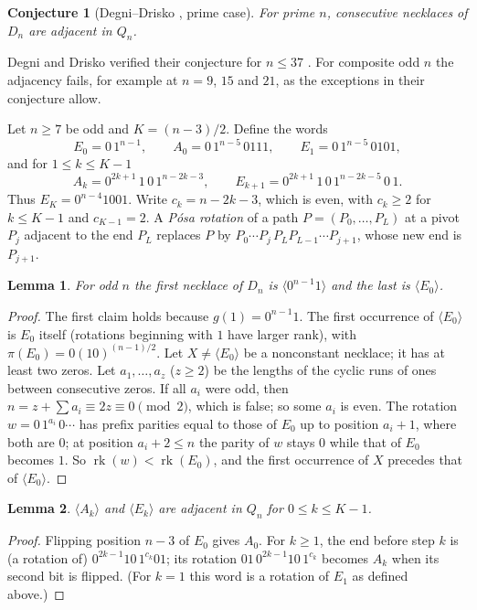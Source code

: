 \documentclass[11pt]{article}
\newtheorem{lemma}{Lemma}
\newtheorem{conjecture}{Conjecture}
\newcommand{\rk}{\operatorname{rk}}
\begin{document}
\begin{conjecture}[Degni--Drisko \cite{DD07}, prime case]\label{conj:DD}
For prime $n$, consecutive necklaces of $D_n$ are adjacent in $Q_n$.
\end{conjecture}

Degni and Drisko verified their conjecture for $n\le 37$ \cite[Section 3]{DD07}. For composite odd $n$ the adjacency
fails, for example at $n=9$, $15$ and $21$, as the exceptions in their conjecture allow.

Let $n\ge7$ be odd and $K=(n-3)/2$. Define the words
\[
E_0=0\,1^{n-1},\qquad A_0=0\,1^{n-5}\,0111,\qquad E_1=0\,1^{n-5}\,0101,
\]
and for $1\le k\le K-1$
\[
A_k=0^{2k+1}\,1\,0\,1^{n-2k-3},\qquad E_{k+1}=0^{2k+1}\,1\,0\,1^{n-2k-5}\,0\,1 .
\]
Thus $E_K=0^{n-4}1001$. Write $c_k=n-2k-3$, which is even, with $c_k\ge 2$ for $k\le K-1$ and $c_{K-1}=2$. A
\emph{P\'osa rotation} of a path $P=(P_0,\dots,P_L)$ at a pivot $P_j$ adjacent to the end $P_L$ replaces $P$ by
$P_0\cdots P_j\,P_L P_{L-1}\cdots P_{j+1}$, whose new end is $P_{j+1}$.

\begin{lemma}\label{lem:last}
For odd $n$ the first necklace of $D_n$ is $\langle0^{n-1}1\rangle$ and the last is $\langle E_0\rangle$.
\end{lemma}
\begin{proof}
The first claim holds because $g(1)=0^{n-1}1$. The first occurrence of $\langle E_0\rangle$ is $E_0$ itself
(rotations beginning with $1$ have larger rank), with $\pi(E_0)=0(10)^{(n-1)/2}$. Let $X\ne\langle E_0\rangle$ be a
nonconstant necklace; it has at least two zeros. Let $a_1,\dots,a_z$ ($z\ge2$) be the lengths of the cyclic runs of
ones between consecutive zeros. If all $a_i$ were odd, then $n=z+\sum a_i\equiv 2z\equiv0\pmod2$, which is false; so
some $a_i$ is even. The rotation $w=0\,1^{a_i}\,0\cdots$ has prefix parities equal to those of $E_0$ up to position
$a_i+1$, where both are $0$; at position $a_i+2\le n$ the parity of $w$ stays $0$ while that of $E_0$ becomes $1$.
So $\rk(w)<\rk(E_0)$, and the first occurrence of $X$ precedes that of $\langle E_0\rangle$.
\end{proof}

\begin{lemma}\label{lem:adj}
$\langle A_k\rangle$ and $\langle E_k\rangle$ are adjacent in $Q_n$ for $0\le k\le K-1$.
\end{lemma}
\begin{proof}
Flipping position $n-3$ of $E_0$ gives $A_0$. For $k\ge1$, the end before step $k$ is (a rotation of)
$0^{2k-1}10\,1^{c_k}01$; its rotation $01\,0^{2k-1}10\,1^{c_k}$ becomes $A_k$ when its second bit is flipped. (For
$k=1$ this word is a rotation of $E_1$ as defined above.)
\end{proof}
\end{document}
